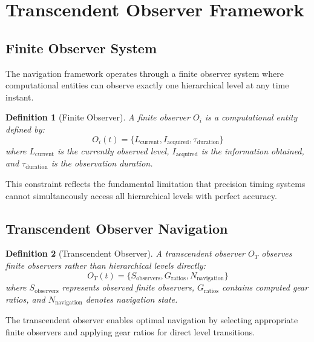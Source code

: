 \documentclass[12pt,a4paper]{article}
\newtheorem{definition}{Definition}
\begin{document}
\section{Transcendent Observer Framework}

\subsection{Finite Observer System}

The navigation framework operates through a finite observer system where computational entities can observe exactly one hierarchical level at any time instant.

\begin{definition}[Finite Observer]
A finite observer $O_i$ is a computational entity defined by:
$$O_i(t) = \{L_{\text{current}}, I_{\text{acquired}}, \tau_{\text{duration}}\}$$
where $L_{\text{current}}$ is the currently observed level, $I_{\text{acquired}}$ is the information obtained, and $\tau_{\text{duration}}$ is the observation duration.
\end{definition}

This constraint reflects the fundamental limitation that precision timing systems cannot simultaneously access all hierarchical levels with perfect accuracy.

\subsection{Transcendent Observer Navigation}

\begin{definition}[Transcendent Observer]
A transcendent observer $O_T$ observes finite observers rather than hierarchical levels directly:
$$O_T(t) = \{S_{\text{observers}}, G_{\text{ratios}}, N_{\text{navigation}}\}$$
where $S_{\text{observers}}$ represents observed finite observers, $G_{\text{ratios}}$ contains computed gear ratios, and $N_{\text{navigation}}$ denotes navigation state.
\end{definition}

The transcendent observer enables optimal navigation by selecting appropriate finite observers and applying gear ratios for direct level transitions.
\end{document}
